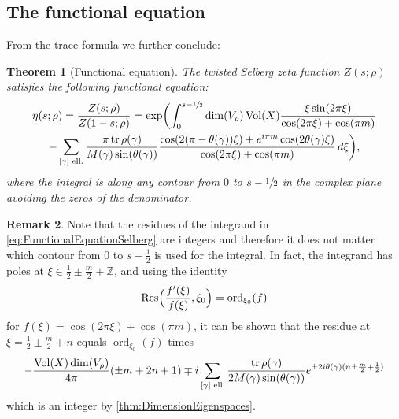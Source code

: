 \documentclass[10pt]{amsart}
\theoremstyle{plain}
\newtheorem{thm}{Theorem}[subsection]
\theoremstyle{definition}
\newtheorem{rmrk}[thm]{Remark}
\theoremstyle{remark}
\newcommand{\Z}{\mathbb{Z}}
\DeclareMathOperator{\tr}{tr}
\DeclareMathOperator{\Vol}{Vol}
\DeclareMathOperator{\Res}{Res}
\numberwithin{equation}{section}
\begin{document}
\subsection{The functional equation}
\label{subsec:FE}
From the trace formula we further conclude:

\begin{thm}[Functional equation]
\label{theo:Funct}
The twisted Selberg zeta function $Z(s;\rho)$ satisfies the following functional equation:
\begin{multline}
\eta(s;\rho) = \frac{Z(s;\rho)}{Z(1-s;\rho)} = \exp\biggl(\int_0^{s-\sfrac{1}{2}}\dim(V_\rho)\Vol(X)\frac{\xi\sin(2\pi\xi)}{\cos(2\pi\xi)+\cos(\pi m)}\\
- \sum_{[\gamma]\textup{ ell.}}\frac{\pi\tr\rho(\gamma)}{M(\gamma)\sin(\theta(\gamma))}\frac{\cos(2(\pi-\theta(\gamma))\xi)+e^{i\pi m}\cos(2\theta(\gamma)\xi)}{\cos(2\pi\xi)+\cos(\pi m)}\,d\xi\biggr),\label{eq:FunctionalEquationSelberg}
\end{multline}
where the integral is along any contour from $0$ to $s-\sfrac{1}{2}$ in the complex plane avoiding the zeros of the denominator.
\end{thm}

\begin{rmrk}
Note that the residues of the integrand in \cref{eq:FunctionalEquationSelberg} are integers and therefore it does not matter which contour from $0$ to $s-\frac{1}{2}$ is used for the integral. In fact, the integrand has poles at $\xi\in\frac{1}{2}\pm\frac{m}{2}+\Z$, and using the identity
\[
\Res\Bigl(\frac{f'(\xi)}{f(\xi)},\xi_0\Bigr) = \operatorname{ord}_{\xi_0}(f)
\]
for $f(\xi)=\cos(2\pi\xi)+\cos(\pi m)$, it can be shown that the residue at $\xi=\frac{1}{2}\pm\frac{m}{2}+n$ equals $\operatorname{ord}_{\xi_0}(f)$ times
\[
-\frac{\Vol(X)\dim(V_\rho)}{4\pi}(\pm m+2n+1) \mp i\sum_{[\gamma]\\\textup{ ell.}}\frac{\tr\rho(\gamma)}{2M(\gamma)\sin(\theta(\gamma))}e^{\pm2i\theta(\gamma)(n\pm\frac{m}{2}+\frac{1}{2})}
\]
which is an integer by \cref{thm:DimensionEigenspaces}.
\end{rmrk}
\end{document}
